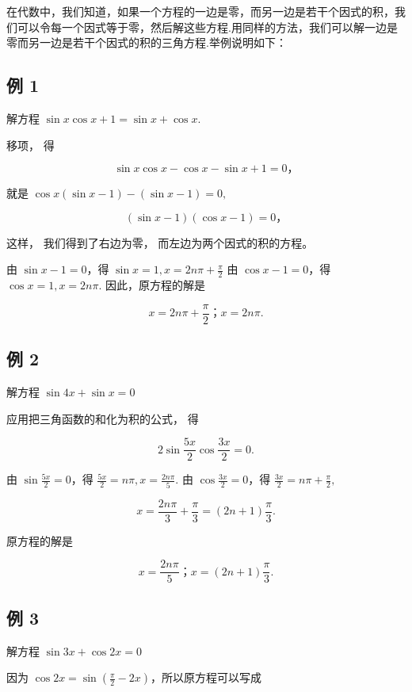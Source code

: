 在代数中，我们知道，如果一个方程的一边是零，而另一边是若干个因式的积，我们可以令每一个因式等于零，然后解这些方程.用同样的方法，我们可以解一边是零而另一边是若干个因式的积的三角方程.举例说明如下：

\subsection{例 1}

解方程 \(\sin x \cos x + 1 = \sin x + \cos x.\)

 移项， 得

\[
\sin x \cos x - \cos x - \sin x + 1 = 0\text{，}
\]

就是 \(\cos x(\sin x - 1) - (\sin x - 1) = 0,\)

\[
(\sin x - 1) (\cos x - 1) = 0\text{，}
\]

这样， 我们得到了右边为零， 而左边为两个因式的积的方程。

由 \(\sin x - 1 = 0\)，得 \(\sin x = 1, x = 2n\pi + \frac{\pi}{2}\) 由
\(\cos x - 1 = 0\)，得 \(\cos x = 1, x = 2n\pi.\) 因此，原方程的解是

\[
x = 2 n \pi + \frac {\pi}{2}\text{；} x = 2 n \pi .
\]

\subsection{例 2}

解方程 \(\sin 4x + \sin x = 0\)

 应用把三角函数的和化为积的公式， 得

\[
2 \sin \frac {5 x}{2} \cos \frac {3 x}{2} = 0.
\]

由 \(\sin \frac{5x}{2} = 0\)，得
\(\frac{5x}{2} = n\pi ,x = \frac{2n\pi}{5}.\) 由
\(\cos \frac{3x}{2} = 0\)，得 \(\frac{3x}{2} = n\pi +\frac{\pi}{2},\)

\[
x = \frac {2 n \pi}{3} + \frac {\pi}{3} = (2 n + 1) \frac {\pi}{3}.
\]

原方程的解是

\[
x = \frac {2 n \pi}{5}\text{；} x = (2 n + 1) \frac {\pi}{3}.
\]

\subsection{例 3}

解方程 \(\sin 3x + \cos 2x = 0\)

 因为
\(\cos 2x = \sin \left(\frac{\pi}{2} - 2x\right)\)，所以原方程可以写成

